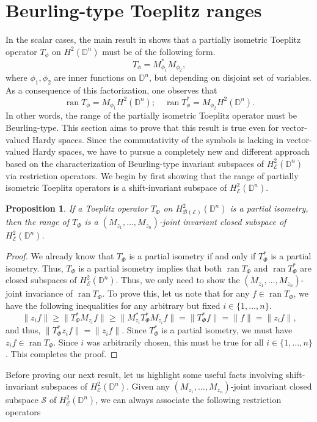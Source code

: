 \documentclass[12pt]{amsart}
\newtheorem{propn}{Proposition}[section]
\theoremstyle{definition}
\newcommand{\D}{\mathbb{D}}
\DeclareMathOperator{\ran}{ran}
\newcommand{\1}{{\mbox{\bf 1}}}
\newcommand{\clb}{\mathcal{B}}
\newcommand{\cle}{\mathcal{E}}
\newcommand{\cls}{\mathcal{S}}
\begin{document}
\section{Beurling-type Toeplitz ranges}\label{Beurling}
In the scalar cases, the main result in \cite{KPS} shows that a partially isometric Toeplitz operator $T_{\phi}$ on $H^2(\D^n)$ must be of the following form.
\[
T_{\phi} = M_{\phi_1}^*M_{\phi_2},
\]
where $\phi_1, \phi_2$ are inner functions on $\D^n$, but depending on disjoint set of variables. As a consequence of this factorization, one observes that 
\[
\ran T_{\phi} = M_{\phi_1} H^2(\D^n); \quad \ran T_{\phi}^* = M_{\phi_2} H^2(\D^n).
\]
In other words, the range of the partially isometric Toeplitz operator must be Beurling-type.  This section aims to prove that this result is true even for vector-valued Hardy spaces.  Since the commutativity of the symbols is lacking in vector-valued Hardy spaces, we have to pursue a completely new and different approach based on the characterization of Beurling-type invariant subspaces of $H_{\cle}^2(\D^n)$ via restriction operators. We begin by first showing that the range of partially isometric Toeplitz operators is a shift-invariant subspace of $H_{\cle}^2(\D^n)$.
\begin{propn}\label{shift-invariant}
If a Toeplitz operator $T_{\Phi}$ on $H_{\clb(\cle)}^2(\D^n)$ is a partial isometry, then the range of $T_{\Phi}$ is a $(M_{z_1}, \ldots, M_{z_n})$-joint invariant closed subspace of $H_{\cle}^2(\D^n)$.
\end{propn}
\begin{proof}
We already know that $T_{\Phi}$ is a partial isometry if and only if $T_{\Phi}^*$ is a partial isometry.  Thus,  $T_{\Phi}$ is a partial isometry implies that both $\ran T_{\Phi}$ and $\ran T_{\Phi}^*$ are closed subspaces of $H_{\cle}^2(\D^n)$.  Thus, we only need to show the $(M_{z_1}, \ldots, M_{z_n})$-joint invariance of $\ran T_{\Phi}$. To prove this, let us note that for any $f \in \ran T_{\Phi}$, we have the following inequalities for any arbitrary but fixed $i \in \{1,\ldots,n\}$.
\[
\|z_i f\| \geq \|T_{\Phi}^* M_{z_i} f\| \geq \|M_{z_i}^* T_{\Phi}^* M_{z_i} f\| = \|T_{\Phi}^* f\| = \|f\| = \|z_i f\|,
\]
and thus, $\|T_{\Phi}^* z_i f\| = \|z_i f \|$. Since $T_{\Phi}^*$ is a partial isometry, we must have $z_i f \in \ran T_{\Phi}$. Since $i$ was arbitrarily chosen, this must be true for all $i \in \{1,\ldots,n\}$. This completes the proof.
\end{proof}
Before proving our next result, let us highlight some useful facts involving shift-invariant subspaces of $H_{\cle}^2(\D^n)$. Given any $(M_{z_1}, \ldots, M_{z_n})$-joint invariant closed subspace $\cls$ of $H_{\cle}^2(\D^n)$, we can always associate the following restriction operators
\end{document}
